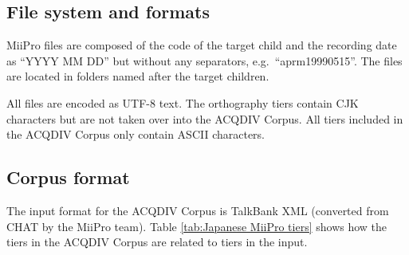\documentclass[a4paper, 11pt]{book}
\begin{document}
\subsection{File system and formats}
MiiPro files are composed of the code of the target child and the recording date as “YYYY MM DD” but without any separators, e.g.\ “aprm19990515”. The files are located in folders named after the target children.

All files are encoded as UTF-8 text. The orthography tiers contain CJK characters but are not taken over into the ACQDIV Corpus. All tiers included in the ACQDIV Corpus only contain ASCII characters. 

\subsection{Corpus format}
The input format for the ACQDIV Corpus is TalkBank XML (converted from CHAT by the MiiPro team). Table \autoref{tab:Japanese MiiPro tiers} shows how the tiers in the ACQDIV Corpus are related to tiers in the input.
\end{document}
